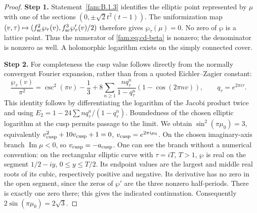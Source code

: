 \begin{proof}
\noindent\textbf{Step 1.} Statement~\ref{fam:B.1.3} identifies the elliptic point represented by \(\mu\) with
one of the sections \((0,\pm\sqrt2t^2(t-1))\). The uniformization map
\((v,\tau)\mapsto(f_{\rm sc}^2\wp_\tau(v),f_{\rm sc}^3\wp'_\tau(v)/2)\) therefore gives
\(\wp_\tau(\mu)=0\). No zero of \(\wp\) is a lattice point. Thus the numerator
of \eqref{fam:eq:cd-beta} is nonzero; the denominator is nonzero as well.
A holomorphic logarithm exists on the simply connected cover.


\noindent\textbf{Step 2.} For completeness the cusp value follows directly from the normally
convergent Fourier expansion, rather than from a quoted Eichler--Zagier
constant:
\begin{equation}\label{fam:eq:cd-wp}
 \frac{\wp_\tau(v)}{\pi^2}
 =\csc^2(\pi v)-\frac13+
 8\sum_{n\geq1}\frac{nq_\tau^n}{1-q_\tau^n}(1-\cos(2\pi nv)),
 \qquad q_\tau=e^{2\pi i\tau}.
\end{equation}
This identity follows by differentiating the logarithm of the Jacobi
product twice and using
\(E_2=1-24\sum nq_\tau^n/(1-q_\tau^n)\). Boundedness of the chosen elliptic logarithm
at the cusp permits passage to the limit. We obtain
\(\sin^2(\pi\mu_0)=3\), equivalently
\(v_{\rm cusp}^2+10v_{\rm cusp}+1=0\), \(v_{\rm cusp}=e^{2\pi i\mu_0}\).
On the chosen imaginary-axis branch \(\operatorname{Im}\mu<0\), so \(v_{\rm cusp}=-a_{\rm cusp}\).
One can see the branch without a numerical convention: on the rectangular
elliptic curve with \(\tau=iT\), \(T>1\), \(\wp\) is real on the segment
\(1/2-iy\), \(0\leq y\leq T/2\). Its endpoint values are the largest and
middle real roots of its cubic, respectively positive and negative.
Its derivative has no zero in the open segment, since the zeros of
\(\wp'\) are the three nonzero half-periods. There is exactly one zero
there; this gives the indicated continuation. Consequently
\(2\sin(\pi\mu_0)=2\sqrt3\).



\end{proof}
